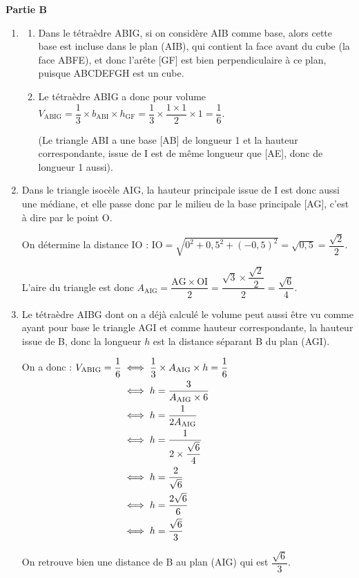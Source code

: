 		\textbf{Partie B}
		\begin{enumerate}
			\item \begin{enumerate}
				\item Dans le tétraèdre ABIG, si on considère AIB comme base, alors cette base est incluse dans le plan (AIB), qui contient la face avant du cube (la face ABFE), et donc l'arête [GF] est bien perpendiculaire à ce plan, puisque ABCDEFGH est un cube.
				\item Le tétraèdre ABIG a donc pour volume $V_{\mathrm{ABIG}} = \dfrac{1}{3} \times b_{\mathrm{ABI}} \times h_{\mathrm{GF}} = \dfrac{1}{3} \times \dfrac{1 \times 1}{2} \times 1 = \dfrac{1}{6}$.

(Le triangle ABI a une base [AB] de longueur 1 et la hauteur correspondante, issue de I est de même longueur que [AE], donc de longueur 1 aussi).
	\end{enumerate}

\item Dans le triangle isocèle AIG, la hauteur principale issue de I est donc aussi une médiane, et elle passe donc par le milieu de la base principale [AG], c'est à dire par le point O.

On détermine la distance IO : $\mathrm{IO} = \sqrt{0^2 + 0,5^2 + (-0,5)^2} = \sqrt{0,5} = \dfrac{\sqrt{2}}{2}$.

L'aire du triangle est donc $A_\mathrm{AIG} = \dfrac{\mathrm{AG} \times \mathrm{OI}}{2} = \dfrac{\sqrt{3}\times \dfrac{\sqrt{2}}{2}}{2} = \dfrac{\sqrt{6}}{4}$.

\item Le tétraèdre AIBG dont on a déjà calculé le volume peut aussi être vu comme ayant pour base le triangle AGI et comme hauteur correspondante, la hauteur issue de B, donc la longueur $h$ est la distance séparant B du plan (AGI).

On a donc : $\aligned[t] V_\mathrm{ABIG} = \dfrac{1}{6} &\iff \dfrac{1}{3}\times A_\mathrm{AIG} \times h = \dfrac{1}{6}\\
			&\iff h = \dfrac{3}{A_\mathrm{AIG}\times 6 }\\
			&\iff h = \dfrac{1}{2A_\mathrm{AIG}}\\
			&\iff h = \dfrac{1}{2\times \dfrac{\sqrt{6}}{4}}\\
			&\iff h = \dfrac{2}{\sqrt{6}}\\
			&\iff h = \dfrac{2\sqrt{6}}{6}\\
			&\iff h = \dfrac{\sqrt{6}}{3}
			\endaligned$

On retrouve bien une distance de B au plan (AIG) qui est $ \dfrac{\sqrt{6}}{3} $.
\end{enumerate}
